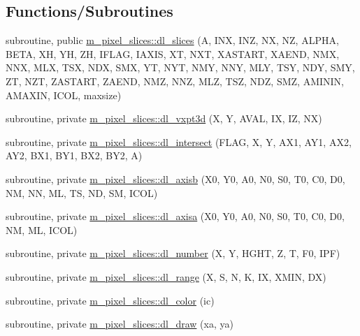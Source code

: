 \subsection*{Functions/\+Subroutines}
\begin{DoxyCompactItemize}
\item 
subroutine, public \mbox{\hyperlink{namespacem__pixel__slices_af2848516f6507a3d0bcca92ff07ef40f}{m\+\_\+pixel\+\_\+slices\+::dl\+\_\+slices}} (A, I\+NX, I\+NZ, NX, NZ, A\+L\+P\+HA, B\+E\+TA, XH, YH, ZH, I\+F\+L\+AG, I\+A\+X\+IS, XT, N\+XT, X\+A\+S\+T\+A\+RT, X\+A\+E\+ND, N\+MX, N\+NX, M\+LX, T\+SX, N\+DX, S\+MX, YT, N\+YT, N\+MY, N\+NY, M\+LY, T\+SY, N\+DY, S\+MY, ZT, N\+ZT, Z\+A\+S\+T\+A\+RT, Z\+A\+E\+ND, N\+MZ, N\+NZ, M\+LZ, T\+SZ, N\+DZ, S\+MZ, A\+M\+I\+N\+IN, A\+M\+A\+X\+IN, I\+C\+OL, maxsize)
\item 
subroutine, private \mbox{\hyperlink{namespacem__pixel__slices_a61f419d67b700758eceed72e406a37f0}{m\+\_\+pixel\+\_\+slices\+::dl\+\_\+vxpt3d}} (X, Y, A\+V\+AL, IX, IZ, NX)
\item 
subroutine, private \mbox{\hyperlink{namespacem__pixel__slices_a1508683ec3b2444091bb34d40b5d8b93}{m\+\_\+pixel\+\_\+slices\+::dl\+\_\+intersect}} (F\+L\+AG, X, Y, A\+X1, A\+Y1, A\+X2, A\+Y2, B\+X1, B\+Y1, B\+X2, B\+Y2, A)
\item 
subroutine, private \mbox{\hyperlink{namespacem__pixel__slices_ab70907b4409a4346c450488b5bcb34a8}{m\+\_\+pixel\+\_\+slices\+::dl\+\_\+axisb}} (X0, Y0, A0, N0, S0, T0, C0, D0, NM, NN, ML, TS, ND, SM, I\+C\+OL)
\item 
subroutine, private \mbox{\hyperlink{namespacem__pixel__slices_afcc122fe448b5f806c0a372a203cd9ea}{m\+\_\+pixel\+\_\+slices\+::dl\+\_\+axisa}} (X0, Y0, A0, N0, S0, T0, C0, D0, NM, ML, I\+C\+OL)
\item 
subroutine, private \mbox{\hyperlink{namespacem__pixel__slices_a7d9372496e88c384aea5ad1b26750d1b}{m\+\_\+pixel\+\_\+slices\+::dl\+\_\+number}} (X, Y, H\+G\+HT, Z, T, F0, I\+PF)
\item 
subroutine, private \mbox{\hyperlink{namespacem__pixel__slices_a47408b6c6411a3c3cb3419b319e57978}{m\+\_\+pixel\+\_\+slices\+::dl\+\_\+range}} (X, S, N, K, IX, X\+M\+IN, DX)
\item 
subroutine, private \mbox{\hyperlink{namespacem__pixel__slices_a8e362bf8eea80faddc97f7d137c95f9c}{m\+\_\+pixel\+\_\+slices\+::dl\+\_\+color}} (ic)
\item 
subroutine, private \mbox{\hyperlink{namespacem__pixel__slices_acafdf0174290a0e231ca120f6305b5d0}{m\+\_\+pixel\+\_\+slices\+::dl\+\_\+draw}} (xa, ya)

\end{DoxyCompactItemize}
